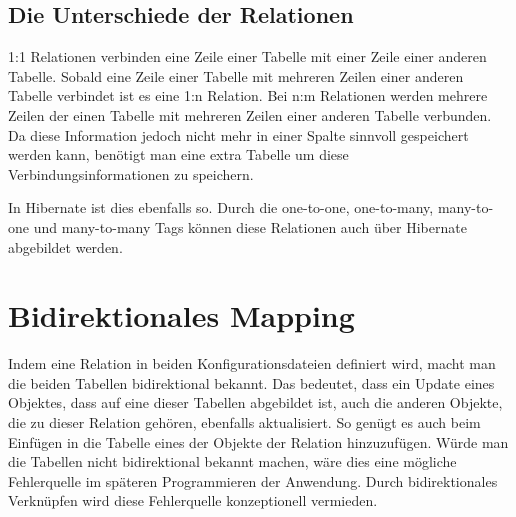\subsection*{Die Unterschiede der Relationen}
1:1 Relationen verbinden eine Zeile einer Tabelle mit einer Zeile einer anderen Tabelle.
Sobald eine Zeile einer Tabelle mit mehreren Zeilen einer anderen Tabelle verbindet ist es eine 1:n Relation. Bei n:m Relationen werden mehrere Zeilen der einen Tabelle mit mehreren Zeilen einer anderen Tabelle verbunden. Da diese Information jedoch nicht mehr in einer Spalte sinnvoll gespeichert werden kann, benötigt man eine extra Tabelle um diese Verbindungsinformationen zu speichern.

In Hibernate ist dies ebenfalls so. Durch die one-to-one, one-to-many, many-to-one und many-to-many Tags können diese Relationen auch über Hibernate abgebildet werden.

\section{Bidirektionales Mapping}
Indem eine Relation in beiden Konfigurationsdateien definiert wird, macht man die beiden Tabellen bidirektional bekannt. Das bedeutet, dass ein Update eines Objektes, dass auf eine dieser Tabellen abgebildet ist, auch die anderen Objekte, die zu dieser Relation gehören, ebenfalls aktualisiert. So genügt es auch beim Einfügen in die Tabelle eines der Objekte der Relation hinzuzufügen. Würde man die Tabellen nicht bidirektional bekannt machen, wäre dies eine mögliche Fehlerquelle im späteren Programmieren der Anwendung. Durch bidirektionales Verknüpfen wird diese Fehlerquelle konzeptionell vermieden.

